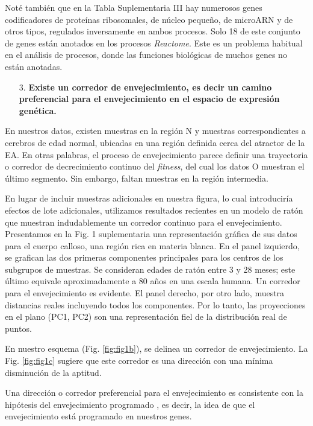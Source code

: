 Noté también que en la \alert{Tabla Suplementaria III} hay numerosos genes codificadores de proteínas ribosomales, de núcleo pequeño, de microARN y de otros tipos, regulados inversamente en ambos procesos. Solo 18 de este conjunto de genes están anotados en los procesos \textit{Reactome}. Este es un problema habitual en el análisis de procesos, donde las funciones biológicas de muchos genes no están anotadas.

\begin{enumerate}
	\item[3.] \textbf{Existe un corredor de envejecimiento, es decir un camino preferencial para el envejecimiento en el espacio de expresión genética.}
\end{enumerate}

En nuestros datos, existen muestras en la región N y muestras correspondientes a cerebros de edad normal, ubicadas en una región definida cerca del atractor de la EA. En otras palabras, el proceso de envejecimiento parece definir una trayectoria o corredor de decrecimiento continuo del \textit{fitness}, del cual los datos O muestran el último segmento. Sin embargo, faltan muestras en la región intermedia.

En lugar de incluir muestras adicionales en nuestra figura, lo cual introduciría efectos de lote adicionales, utilizamos resultados recientes en un modelo de ratón \cite{hahn2023atlas} que muestran indudablemente un corredor continuo para el envejecimiento. Presentamos en la \alert{Fig. 1 suplementaria} una representación gráfica de sus datos para el cuerpo calloso, una región rica en materia blanca. \alert{En el panel izquierdo}, se grafican las dos primeras componentes principales para los centros de los subgrupos de muestras. Se consideran edades de ratón entre 3 y 28 meses; este último equivale aproximadamente a 80 años en una escala humana. Un corredor para el envejecimiento es evidente. \alert{El panel derecho}, por otro lado, muestra distancias reales incluyendo todos los componentes. Por lo tanto, las proyecciones en el plano (PC1, PC2) son una representación fiel de la distribución real de puntos.

En nuestro esquema (Fig. \ref{fig:fig1b}), se delinea un corredor de envejecimiento. La Fig. \ref{fig:fig1c} sugiere que este corredor es una dirección con una mínima disminución de la aptitud.

Una dirección o corredor preferencial para el envejecimiento es consistente con la hipótesis del envejecimiento programado \cite{Magalh_es_2012, Gems_2022}, es decir, la idea de que el envejecimiento está programado en nuestros genes.

